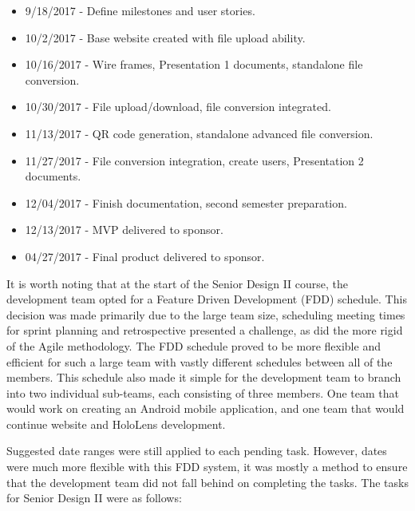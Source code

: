 \begin{itemize}
	\item 9/18/2017   - Define milestones and user stories.
	\item 10/2/2017   - Base website created with file upload ability.
	\item 10/16/2017  - Wire frames, Presentation 1 documents, standalone file conversion.
	\item 10/30/2017  - File upload/download, file conversion integrated.
	\item 11/13/2017  - QR code generation, standalone advanced file conversion.
	\item 11/27/2017  - File conversion integration, create users, Presentation 2 documents.
	\item 12/04/2017  - Finish documentation, second semester preparation.
	\item 12/13/2017  - MVP delivered to sponsor.
	\item 04/27/2017  - Final product delivered to sponsor.
\end{itemize}

	It is worth noting that at the start of the Senior Design II course, the development team opted for a Feature Driven Development (FDD) schedule.  This decision was made primarily due to the large team size, scheduling meeting times for sprint planning and retrospective presented a challenge, as did the more rigid of the Agile methodology. The FDD schedule proved to be more flexible and efficient for such a large team with vastly different schedules between all of the members.  This schedule also made it simple for the development team to branch into two individual sub-teams, each consisting of three members.  One team that would work on creating an Android mobile application, and one team that would continue website and HoloLens development.

	Suggested date ranges were still applied to each pending task. However, dates were much more flexible with this FDD system, it was mostly a method to ensure that the development team did not fall behind on completing the tasks.  The tasks for Senior Design II were as follows:

